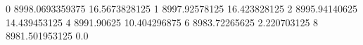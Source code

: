 0 8998.0693359375 16.5673828125
1 8997.92578125 16.423828125
2 8995.94140625 14.439453125
4 8991.90625 10.404296875
6 8983.72265625 2.220703125
8 8981.501953125 0.0
